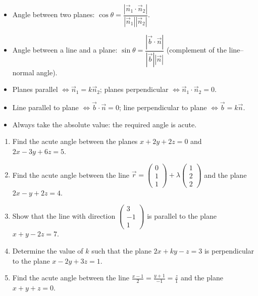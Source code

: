 \documentclass[11pt]{article}
\begin{document}
\begin{aretenir}
\begin{itemize}
\item Angle between two planes: $\cos\theta=\dfrac{|\vec{n}_1\cdot\vec{n}_2|}{|\vec{n}_1||\vec{n}_2|}$.
\item Angle between a line and a plane: $\sin\theta=\dfrac{|\vec{b}\cdot\vec{n}|}{|\vec{b}||\vec{n}|}$ (complement of the line--normal angle).
\item Planes parallel $\iff \vec{n}_1=k\vec{n}_2$; planes perpendicular $\iff \vec{n}_1\cdot\vec{n}_2=0$.
\item Line parallel to plane $\iff \vec{b}\cdot\vec{n}=0$; line perpendicular to plane $\iff \vec{b}=k\vec{n}$.
\item Always take the absolute value: the required angle is acute.
\end{itemize}
\end{aretenir}

\begin{exercice}[Practice]
\begin{enumerate}
\item Find the acute angle between the planes $x+2y+2z=0$ and $2x-3y+6z=5$.
\item Find the acute angle between the line $\vec{r}=\begin{pmatrix}0\\1\\1\end{pmatrix}+\lambda\begin{pmatrix}1\\2\\2\end{pmatrix}$ and the plane $2x-y+2z=4$.
\item Show that the line with direction $\begin{pmatrix}3\\-1\\1\end{pmatrix}$ is parallel to the plane $x+y-2z=7$.
\item Determine the value of $k$ such that the plane $2x+ky-z=3$ is perpendicular to the plane $x-2y+3z=1$.
\item Find the acute angle between the line $\frac{x-1}{2}=\frac{y+1}{-1}=\frac{z}{1}$ and the plane $x+y+z=0$.
\end{enumerate}
\end{exercice}
\end{document}
